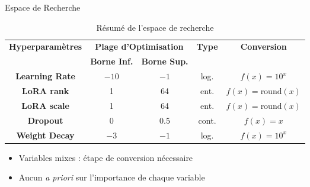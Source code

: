 \begin{frame}{Espace de Recherche}

    \begin{table}[h]
        \centering
        \begin{tabular}{|c|c|c|c|c|}
            \hline
            \multirow{2}{*}{\textbf{ Hyperparamètres }} & \multicolumn{2}{|c|}{\textbf{Plage d'Optimisation}} &\multirow{2}{*}{\textbf{ Type }}& \multirow{2}{*}{\textbf{ Conversion }} \\
            \cline{2-3}
             & \textbf{ Borne Inf. } & \textbf{ Borne Sup. } & & \\
            \hline
            \textbf{Learning Rate} & $-10$ & $-1$ & log. & $f(x) = 10^{x}$ \\
            \hline
            \textbf{LoRA rank} & 1 & 64 &ent. &$f(x) = \text{round}(x)$ \\
            \hline
            \textbf{LoRA scale} &1 & 64 & ent. &$f(x) = \text{round}(x)$ \\
            \hline
            \textbf{Dropout} & 0 & 0.5 & cont.& $f(x) = x$ \\
            \hline
            \textbf{Weight Decay} & $-3$ & $-1$ &log.& $f(x) = 10^{x}$  \\
            \hline
        \end{tabular}
        \caption{Résumé de l'espace de recherche}
    \end{table}

    \begin{itemize}
        \item Variables mixes : étape de conversion nécessaire
        \item Aucun \textit{a priori} sur l'importance de chaque variable
    \end{itemize}

\end{frame}

